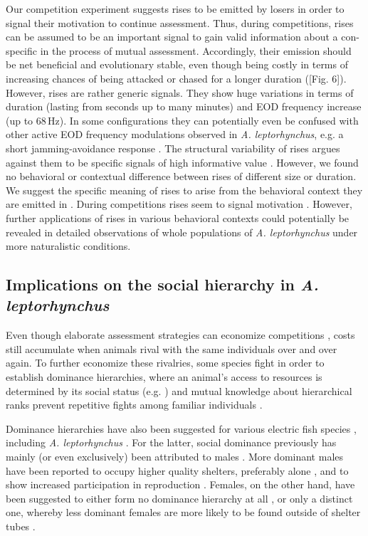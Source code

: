 \documentclass[11pt,pdftex]{article}
\newcommand{\note}[2][]{\textcolor{red!80!black}{[\textbf{\ifthenelse{\equal{#1}{}}{}{#1: }}#2]}}
\newcommand{\notetr}[1]{\note[TR]{#1}}
\newcommand{\lepto}{\textit{A. leptorhynchus}}
\begin{document}
Our competition experiment suggests rises to be emitted by losers in order to signal their motivation to continue assessment. Thus, during competitions, rises can be assumed to be an important signal to gain valid information about a con-specific in the process of mutual assessment. Accordingly, their emission should be net beneficial and evolutionary stable, even though being costly in terms of increasing chances of being attacked or chased for a longer duration (\notetr{Fig. 6}). However, rises are rather generic signals. They show huge variations in terms of duration (lasting from seconds up to many minutes) and EOD frequency increase (up to 68\,Hz). In some configurations they can potentially even be confused with other active EOD frequency modulations observed in \lepto{}, e.g. a short jamming-avoidance response \citep{Tallarovic2005}. The structural variability of rises argues against them to be specific signals of high informative value \citep{Seyfarth2003}. However, we found no behavioral or contextual difference between rises of different size or duration. We suggest the specific meaning of rises to arise from the behavioral context they are emitted in \citep{Seyfarth2003}. During competitions rises seem to signal motivation \citep{Raab2021}. However, further applications of rises in various behavioral contexts could potentially be revealed in detailed observations of whole populations of \lepto{} under more naturalistic conditions.

\subsection{Implications on the social hierarchy in \lepto{}}

Even though elaborate assessment strategies can economize competitions \citep{ArnottElwood2009}, costs still accumulate when animals rival with the same individuals over and over again. To further economize these rivalries, some species fight in order to establish dominance hierarchies, where an animal's access to resources is determined by its social status (e.g. \citealp{Wauters1992, Sapolsky2005, Taves2009}) and mutual knowledge about hierarchical ranks prevent repetitive fights among familiar individuals \citep{Cluttonbrock1979, Fernald2014, Cornhill2020}.

Dominance hierarchies have also been suggested for various electric fish species \citep{Westby1970, Fugere2011, Silva2012}, including \lepto{} \citep{Hagedorn1985, Dunlap2002, Stamper2010, Henninger2018}. For the latter, social dominance previously has mainly (or even exclusively) been attributed to males \citep{Hagedorn1985, Dunlap2002}. More dominant males have been reported to occupy higher quality shelters, preferably alone \citep{Dunlap2002}, and to show increased participation in reproduction \citep{Hagedorn1985, Henninger2018}. Females, on the other hand, have been suggested to either form no dominance hierarchy at all \citep{Hagedorn1985}, or only a distinct one, whereby less dominant females are more likely to be found outside of shelter tubes \citep{Dunlap2002}. 
\end{document}
